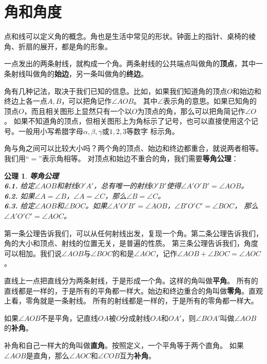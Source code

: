 \documentclass[12pt,UTF8]{ctexbook}
\newtheorem{po}{公理}
\begin{document}
\section{角和角度}
点和线可以定义角的概念。角也是生活中常见的形状。钟面上的指针、桌椅的棱角、折扇的展开，都是角的形象。

一点发出的两条射线，就构成一个角。两条射线的公共端点叫做角的\textbf{顶点}，其中一条射线叫做角的\textbf{始边}，另一条叫做角的\textbf{终边}。

角有几种记法，取决于我们已知的信息。比如，如果我们知道角的顶点$O$和始边和终边上各一点$A,B$，可以把角记作$\angle AOB$。
其中$\angle$表示角的意思。如果已知角的顶点$O$，而且相关图形上显然只有一个以$O$为顶点的角，那么可以把角简记作$\angle O$。
如果不知道角的顶点，但相关图形上为角标示了记号，也可以直接使用这个记号。一般用小写希腊字母$\alpha, \beta, \gamma$或$1,2,3$等数字
标示角。

角与角之间可以比较大小吗？两个角的顶点、始边和终边都重合，就说两者相等。我们用“$=$”表示角相等。
对顶点和始边不重合的角，我们需要\textbf{等角公理}：
\begin{po}{\textbf{等角公理}}\label{po:5}
    \mbox{}\\
    \indent \textbf{6.1.} 给定$\angle AOB$和射线$O'A'$，总有唯一的射线$O'B'$使得$\angle A'O'B' = \angle AOB$。\\
    \indent \textbf{6.2.} 如果$\angle A = \angle B$，$\angle A = \angle C$，那么$\angle B = \angle C$。\\
    \indent \textbf{6.3.} 给定$\angle AOB$和$\angle BOC$。如果$\angle A'O'B' = \angle AOB$，$\angle B'O'C' = \angle BOC$，
    那么$\angle A'O'C' = \angle AOC$。
\end{po}
第一条公理告诉我们，可以从任何射线出发，复现一个角。第二条公理告诉我们，角的大小和顶点、射线的位置无关，是普遍的性质。
第三条公理告诉我们，角度可以相加。我们说$\angle AOB$与$\angle BOC$的和是$\angle AOC$，记作$\angle AOB + \angle BOC = \angle AOC$。

直线上一点把直线分为两条射线，于是形成一个角。这样的角叫做\textbf{平角}。
所有的直线都是一样的，于是所有的平角都一样大。始边和终边重合的角叫做\textbf{零角}。直观上看，零角就是一条射线。
所有的射线都是一样的，于是所有的零角都一样大。

如果$\angle AOB$不是平角，记直线$OA$被$O$分成射线$OA$和$OA'$，则$\angle BOA'$叫做$\angle AOB$的\textbf{补角}。

补角和自己一样大的角叫做\textbf{直角}。按照定义，一个平角等于两个直角。
如果$\angle AOB$是直角，那么$\angle AOC$和$\angle COB$互为\textbf{补角}。
\end{document}
